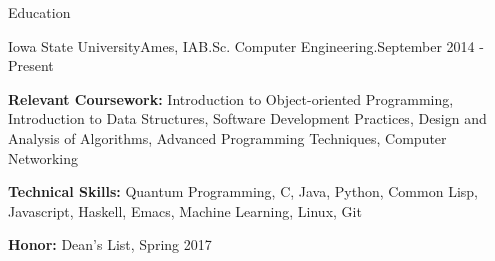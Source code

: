 \documentclass{resume} %
\begin{document}

\begin{rSection}{Education}

\begin{rSubsection}{Iowa State University}{Ames, IA}{B.Sc. Computer Engineering.}{September 2014 - Present}


\item{\textbf{Relevant Coursework:} Introduction to Object-oriented Programming, Introduction to Data Structures, Software Development Practices, Design and Analysis of Algorithms, Advanced Programming Techniques, Computer Networking}
\item{\textbf{Technical Skills:} Quantum Programming, C, Java, Python, Common Lisp, Javascript, Haskell, Emacs, Machine Learning, Linux, Git}
\item{\textbf{Honor:} Dean's List, Spring 2017 }



\end{rSubsection}
\end{rSection}

\end{document}
